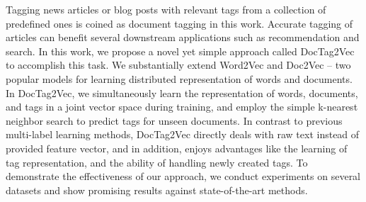 Tagging news articles or blog posts with relevant tags from a collection of predefined ones is coined as document tagging in this work. Accurate tagging of articles can benefit several downstream applications such as recommendation and search. In this work, we propose a novel yet simple approach called DocTag2Vec to accomplish this task. We substantially extend Word2Vec and Doc2Vec -- two popular models for learning  distributed representation of words and documents. In DocTag2Vec, we simultaneously learn the representation of words, documents, and tags in a joint vector space during training, and employ the simple k-nearest neighbor search to predict tags for unseen documents. In contrast to previous multi-label learning methods, DocTag2Vec directly deals with raw text instead of provided feature vector, and in addition, enjoys advantages like the learning of tag representation, and the ability of handling newly created tags. To demonstrate the effectiveness of our approach, we conduct experiments on several datasets and show promising results against state-of-the-art methods.
